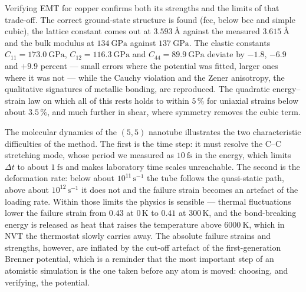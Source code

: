 \documentclass[11pt,a4paper]{article}
\numberwithin{equation}{section}
\theoremstyle{remark}
\begin{document}
Verifying EMT for copper confirms both its strengths and the limits of that trade-off. The correct
ground-state structure is found (fcc, below bcc and simple cubic), the lattice constant comes out at
$\SI{3.593}{\angstrom}$ against the measured $\SI{3.615}{\angstrom}$ and the bulk modulus at
$\SI{134}{\giga\pascal}$ against $\SI{137}{\giga\pascal}$. The elastic constants
$C_{11} = \SI{173.0}{\giga\pascal}$, $C_{12} = \SI{116.3}{\giga\pascal}$ and
$C_{44} = \SI{89.9}{\giga\pascal}$ deviate by $-1.8$, $-6.9$ and $+9.9$ percent --- small errors where
the potential was fitted, larger ones where it was not --- while the Cauchy violation and the Zener
anisotropy, the qualitative signatures of metallic bonding, are reproduced. The quadratic energy--strain
law on which all of this rests holds to within $5\,\%$ for uniaxial strains below about $3.5\,\%$, and
much further in shear, where symmetry removes the cubic term.

The molecular dynamics of the $(5,5)$ nanotube illustrates the two characteristic difficulties of the
method. The first is the time step: it must resolve the C--C stretching mode, whose period we measured
as $\SI{10}{\femto\second}$ in the energy, which limits $\Delta t$ to about $\SI{1}{\femto\second}$ and
makes laboratory time scales unreachable. The second is the deformation rate: below about
$10^{11}\,\mathrm{s^{-1}}$ the tube follows the quasi-static path, above about
$10^{12}\,\mathrm{s^{-1}}$ it does not and the failure strain becomes an artefact of the loading rate.
Within those limits the physics is sensible --- thermal fluctuations lower the failure strain from
$0.43$ at 0\,K to $0.41$ at 300\,K, and the bond-breaking energy is released as heat that raises the
temperature above $\SI{6000}{\kelvin}$, which in NVT the thermostat slowly carries away. The
absolute failure strains and strengths, however, are inflated by the cut-off artefact of the
first-generation Brenner potential, which is a reminder that the most important step of an atomistic
simulation is the one taken before any atom is moved: choosing, and verifying, the potential.
\end{document}
